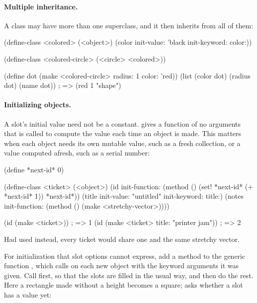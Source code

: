 \paragraph{Multiple inheritance.} A class may have more than one
superclass, and it then inherits from all of them:

\begin{dylan}
(define-class <colored> (<object>)
  (color init-value: 'black init-keyword: color:))

(define-class <colored-circle> (<circle> <colored>))

(define dot (make <colored-circle> radius: 1 color: 'red))
(list (color dot) (radius dot) (name dot))   ; => (red 1 "shape")
\end{dylan}

\paragraph{Initializing objects.}
A slot's initial value need not be a constant. 
gives a function of no arguments that is called to compute the value each
time an object is made. This matters when each object needs its own
mutable value, such as a fresh collection, or a value computed afresh,
such as a serial number:

\begin{dylan}
(define *next-id* 0)

(define-class <ticket> (<object>)
  (id    init-function: (method ()
                          (set! *next-id* (+ *next-id* 1))
                          *next-id*))
  (title init-value: "untitled" init-keyword: title:)
  (notes init-function: (method () (make <stretchy-vector>))))

(id (make <ticket>))                         ; => 1
(id (make <ticket> title: "printer jam"))    ; => 2
\end{dylan}

Had  used  instead, every ticket would share
one and the same stretchy vector.

For initialization that slot options cannot express, add a method to the
generic function , which  calls on each new
object with the keyword arguments it was given. Call 
first, so that the slots are filled in the usual way, and then do the
rest. Here a rectangle made without a height becomes a square;
 asks whether a slot has a value yet:

